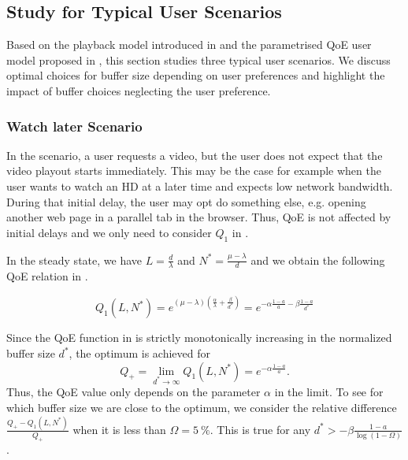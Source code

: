 \subsection{ Study for Typical User Scenarios}\label{sec:application:qoe_user_behaviour:typical_user_scenarios}
Based on the playback model introduced in  and the parametrised \gls{QoE} user model proposed in , this section studies three typical user scenarios.
We discuss optimal choices for buffer size depending on user preferences and highlight the impact of buffer choices neglecting the user preference.

\subsubsection*{Watch later Scenario}\label{sec:application:qoe_user_behaviour:typical_user_scenarios:watch_later}
In the \watchLater scenario, a user requests a video, but the user does not expect that the video playout starts immediately. 
This may be the case for example when the user wants to watch an HD at a later time and expects low network bandwidth. 
During that initial delay, the user may opt do something else, e.g. opening another web page in a parallel tab in the browser.
Thus, \gls{QoE} is not affected by initial delays and we only need to consider \(Q_1\) in .

In the steady state, we have \(L=\frac{d}{\lambda}\) and \(N^*=\frac{\mu-\lambda}{d}\) and we obtain the following QoE relation in . 

\begin{equation}
   Q_1(L,N^*) = e^{\left(\mu-\lambda\right)(\frac{\alpha}{\lambda} +\frac{\beta}{d^*})}
	 = e^{-\alpha \frac{1-a}{a} - \beta \frac{1-a}{d^*}}
\label{eq:application:qoe_user_behaviour:typical_user_scenarios:stalling_steady_state}
\end{equation}

Since the \gls{QoE} function in  is strictly monotonically increasing in the normalized buffer size \(d^*\), the optimum is achieved for 
\[Q_+=\lim\limits_{d^* \to \infty} Q_1(L,N^*)=e^{-\alpha \frac{1-a}{a}}.\]
Thus, the QoE value only depends on the parameter \(\alpha\) in the limit.
To see for which buffer size we are close to the optimum, we consider the relative difference \(\frac{Q_+-Q_1(L,N^*)}{Q_+}\) when it is less than \(\Omega=\SI{5}{\percent}\).
This is true for any \(d^*> -\beta \frac{1-a}{\log\left(1-\Omega\right)}\). 

